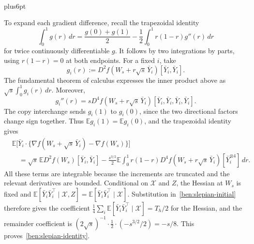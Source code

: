 \documentclass[11pt,letterpaper,twoside,leqno]{article}
\makeatletter
\theoremstyle{bookplain}
\theoremstyle{bookremark}
\renewenvironment{proof}[1][\proofname]{\par
  \pushQED{\qed}\normalfont\topsep6pt plus6pt\relax
  \trivlist\item[\hskip\labelsep\bfseries #1\@addpunct{.}]\ignorespaces
}{\popQED\endtrivlist\@endpefalse}
\newcommand{\E}{\mathbb E}
\makeatother
\begin{document}
\begin{proof}
To expand each gradient difference, recall the trapezoidal identity
\[
 \int_0^1g(r)\,dr
 =\frac{g(0)+g(1)}2-\frac12\int_0^1r(1-r)g''(r)\,dr
\]
for twice continuously differentiable $g$. It follows by two
integrations by parts, using $r(1-r)=0$ at both endpoints.
For a fixed $i$, take
\[
 g_i(r):=D^2f(W_s+r\sqrt s\,\bar Y_i)[\bar Y_i,\bar Y_i].
\]
The fundamental theorem of calculus expresses the inner product
above as $\sqrt s\int_0^1g_i(r)\,dr$.
Moreover,
\[
 g_i''(r)=sD^4f(W_s+r\sqrt s\,\bar Y_i)
                   [\bar Y_i,\bar Y_i,\bar Y_i,\bar Y_i].
\]
The copy interchange sends $g_i(1)$ to $g_i(0)$, since the two
directional factors change sign together. Thus
$\E g_i(1)=\E g_i(0)$, and the trapezoidal identity gives
\begin{align*}
 &\E\big[\bar Y_i\cdot
   \{\nabla f(W_s+\sqrt s\,\bar Y_i)-\nabla f(W_s)\}\big]\\
 &\quad=\sqrt s\,\E D^2f(W_s)[\bar Y_i,\bar Y_i]
 -\frac{s^{3/2}}2\E\int_0^1r(1-r)
       D^4f(W_s+r\sqrt s\,\bar Y_i)[\bar Y_i^{\otimes4}]\,dr.
\end{align*}
All these terms are integrable because the increments are truncated
and the relevant derivatives are bounded. Conditional on
$\mathcal X$ and $Z$, the Hessian at $W_s$ is fixed and
$\E[\bar Y_i\bar Y_i^\top\mid\mathcal X,Z]
=\E[\bar Y_i\bar Y_i^\top\mid\mathcal X]$.
Substitution in~\eqref{ben:slepian-initial} therefore gives the
coefficient $\tfrac14\sum_i\E[\bar Y_i\bar Y_i^\top\mid\mathcal X]
=T_h/2$ for the Hessian, and the remainder coefficient is
$(2\sqrt s)^{-1}\cdot\tfrac12\cdot(-s^{3/2}/2)=-s/8$.
This proves~\eqref{ben:slepian-identity}.
\end{proof}
\end{document}
